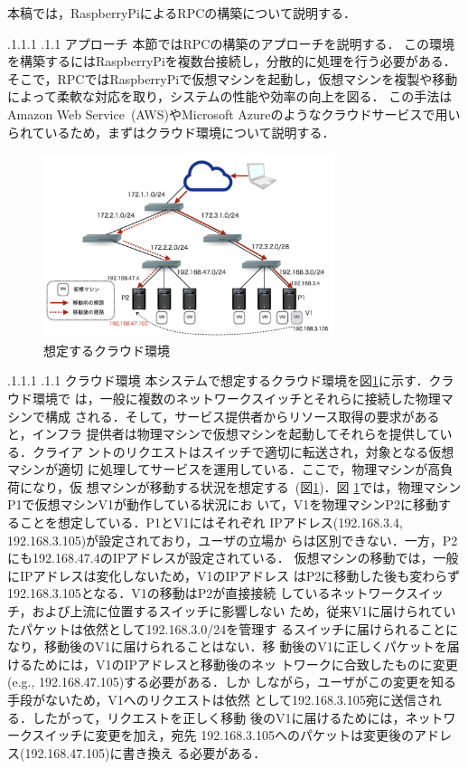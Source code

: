 \documentclass[a4paper, twocolumn]{jarticle}
\makeatletter
\def\section{\@startsection{section}{1}{\z@}%
 {.1\Cvs \@plus.1\Cdp \@minus.1\Cdp}%
 {.1\Cvs \@plus.1\Cdp}%
 {\normalfont\normalsize\bfseries}}
\def\subsection{\@startsection{subsection}{1}{\z@}%
 {.1\Cvs \@plus.1\Cdp \@minus.1\Cdp}%
 {.1\Cvs \@plus.1\Cdp}%
 {\normalfont\normalsize\bfseries}}
\makeatother
\begin{document}
本稿では，RaspberryPiによるRPCの構築について説明する．

\section{アプローチ}
本節ではRPCの構築のアプローチを説明する．
この環境を構築するにはRaspberryPiを複数台接続し，分散的に処理を行う必要がある．
そこで，RPCではRaspberryPiで仮想マシンを起動し，仮想マシンを複製や移動によって柔軟な対応を取り，システムの性能や効率の向上を図る．
この手法はAmazon Web Service~(AWS)\cite{aws}やMicrosoft Azure\cite{azure}のようなクラウドサービスで用いられているため，まずはクラウド環境について説明する．

\begin{figure}[t]
	\includegraphics[width=8.5cm]{fig/cloud.png}
	\caption{想定するクラウド環境}
	\label{fig:cloud}
\end{figure}

\subsection{クラウド環境}
\label{subsec:cloud}
本システムで想定するクラウド環境を図\ref{fig:cloud}に示す．クラウド環境で
は，一般に複数のネットワークスイッチとそれらに接続した物理マシンで構成
される．そして，サービス提供者からリソース取得の要求があると，インフラ
提供者は物理マシンで仮想マシンを起動してそれらを提供している．クライア
ントのリクエストはスイッチで適切に転送され，対象となる仮想マシンが適切
に処理してサービスを運用している．ここで，物理マシンが高負荷になり，仮
想マシンが移動する状況を想定する~(図\ref{fig:cloud})．図
\ref{fig:cloud}では，物理マシンP1で仮想マシンV1が動作している状況にお
いて，V1を物理マシンP2に移動することを想定している．P1とV1にはそれぞれ
IPアドレス(192.168.3.4, 192.168.3.105)が設定されており，ユーザの立場か
らは区別できない．一方，P2にも192.168.47.4のIPアドレスが設定されている．
仮想マシンの移動では，一般にIPアドレスは変化しないため，V1のIPアドレス
はP2に移動した後も変わらず192.168.3.105となる．V1の移動はP2が直接接続
しているネットワークスイッチ，および上流に位置するスイッチに影響しない
ため，従来V1に届けられていたパケットは依然として192.168.3.0/24を管理す
るスイッチに届けられることになり，移動後のV1に届けられることはない．移
動後のV1に正しくパケットを届けるためには，V1のIPアドレスと移動後のネッ
トワークに合致したものに変更(e.g., 192.168.47.105)する必要がある．しか
しながら，ユーザがこの変更を知る手段がないため，V1へのリクエストは依然
として192.168.3.105宛に送信される．したがって，リクエストを正しく移動
後のV1に届けるためには，ネットワークスイッチに変更を加え，宛先
192.168.3.105へのパケットは変更後のアドレス(192.168.47.105)に書き換え
る必要がある．
\end{document}

